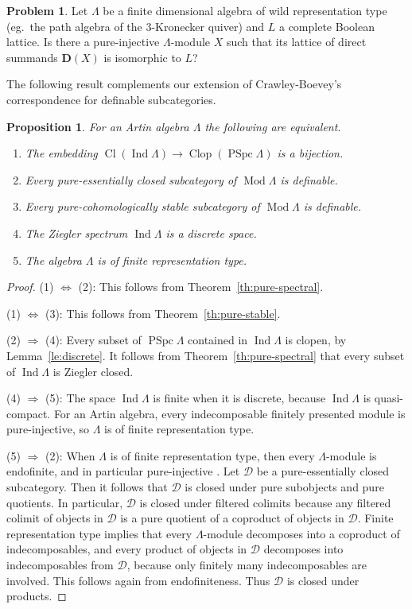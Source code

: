 \documentclass[a4paper]{amsart}
\theoremstyle{plain}
\newtheorem{prop}[thm]{Proposition}
\theoremstyle{definition}
\newtheorem{probl}[thm]{Problem}
\theoremstyle{remark}
\numberwithin{equation}{section}
\newcommand{\Cl}{\operatorname{Cl}}
\newcommand{\Clop}{\operatorname{Clop}}
\newcommand{\Ind}{\operatorname{Ind}}
\newcommand{\Mod}{\operatorname{Mod}}
\newcommand{\PSpc}{\operatorname{PSpc}}
\def\D{\mathcal D}
\def\bfD{\mathbf D}
\def\La{\Lambda}
\begin{document}
\begin{probl}
  Let $\La$ be a finite dimensional algebra of wild representation
  type (eg.\ the path algebra of the $3$-Kronecker quiver) and $L$ a
  complete Boolean lattice. Is there a pure-injective $\La$-module $X$
  such that its lattice of direct summands $\bfD(X)$ is isomorphic to
  $L$?
\end{probl}


The following result complements our extension of Crawley-Boevey's
correspondence for definable subcategories.

\begin{prop}\label{pr:fin-type}
  For an Artin algebra $\La$ the following are equivalent.
  \begin{enumerate}
  \item  The embedding $\Cl(\Ind\La)\to \Clop(\PSpc\La)$ is a bijection.
  \item Every pure-essentially closed subcategory of $\Mod\La$ is definable. 
  \item Every pure-cohomologically stable subcategory of $\Mod\La$ is definable. 
  \item The Ziegler spectrum $\Ind\La$ is a discrete space.
  \item The algebra $\La$ is of finite representation type.
  \end{enumerate}
\end{prop}
\begin{proof}
  (1) $\Leftrightarrow$ (2): This follows from Theorem~\ref{th:pure-spectral}. 

  (1) $\Leftrightarrow$ (3): This follows from Theorem~\ref{th:pure-stable}. 

  (2) $\Rightarrow$ (4): Every subset of $\PSpc\La$ contained in
  $\Ind\La$ is clopen, by Lemma~\ref{le:discrete}. It follows from
  Theorem~\ref{th:pure-spectral} that every subset of $\Ind\La$ is
  Ziegler closed.

  (4) $\Rightarrow$ (5): The space $\Ind\La$ is finite when it is
  discrete, because $\Ind\La$ is quasi-compact. For an Artin algebra,
  every indecomposable finitely presented module is pure-injective, so
  $\La$ is of finite representation type.

  (5) $\Rightarrow$ (2): When $\La$ is of finite representation type,
  then every $\La$-module is endofinite, and in particular
  pure-injective \cite[Theorem~13.2.10]{Kr2022}.  Let $\D$ be a
  pure-essentially closed subcategory. Then it follows that $\D$ is
  closed under pure subobjects and pure quotients. In particular, $\D$
  is closed under filtered colimits because any filtered colimit of
  objects in $\D$ is a pure quotient of a coproduct of objects in
  $\D$. Finite representation type implies that every $\La$-module
  decomposes into a coproduct of indecomposables, and every product of
  objects in $\D$ decomposes into indecomposables from $\D$, because
  only finitely many indecomposables are involved. This follows again
  from endofiniteness. Thus $\D$ is closed under products.
\end{proof}
\end{document}
